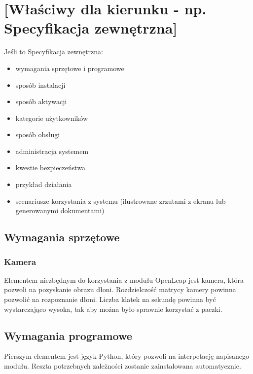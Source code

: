 

\chapter{[Właściwy dla kierunku - np. Specyfikacja zewnętrzna]}
Jeśli to Specyfikacja zewnętrzna:
\begin{itemize}
\item  wymagania sprzętowe i programowe
\item  sposób instalacji
\item  sposób aktywacji
\item  kategorie użytkowników
\item  sposób obsługi
\item   administracja systemem
\item  kwestie bezpieczeństwa
\item  przykład działania
\item  scenariusze korzystania z systemu (ilustrowane zrzutami z ekranu lub generowanymi dokumentami)
\end{itemize}

\section{Wymagania sprzętowe}
\subsection{Kamera}
\quad Elementem niezbędnym do korzystania z modułu OpenLeap jest kamera, która pozwoli na pozyskanie obrazu dłoni. Rozdzielczość matrycy kamery powinna pozwolić na rozpoznanie dłoni. Liczba klatek na sekundę powinna być wystarczająco wysoka, tak aby można było sprawnie korzystać z paczki. 

\section{Wymagania programowe}
\quad Pierszym elementem jest język Python, który pozwoli na interpetację napisanego modułu. 
\quad Reszta potrzebnych zależności zostanie zainstalowana automatycznie. 

